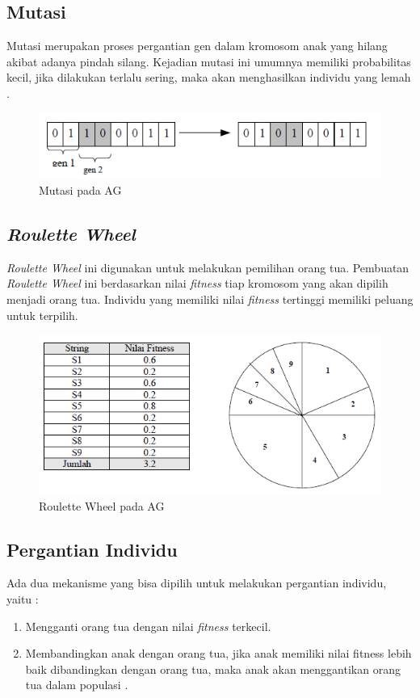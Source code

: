 \documentclass[12pt,a4paper]{report}
\begin{document}
		\subsection{Mutasi}
		Mutasi merupakan proses pergantian gen dalam kromosom anak yang hilang akibat adanya pindah silang. Kejadian mutasi ini umumnya memiliki probabilitas kecil, jika dilakukan terlalu sering, maka akan menghasilkan individu yang lemah \cite{Suyanto2007}.
		\begin{figure}[h]
			\centering
			\includegraphics[width=0.7\linewidth]{mutasi}
			\caption{Mutasi pada AG}
			\label{fig:mutasi}
		\end{figure}
		
		\subsection{\emph{Roulette Wheel}}
		\emph{Roulette Wheel} ini digunakan untuk melakukan pemilihan orang tua. Pembuatan \emph{Roulette Wheel} ini berdasarkan nilai \emph{fitness} tiap kromosom yang akan dipilih menjadi orang tua. Individu yang memiliki nilai \emph{fitness} tertinggi memiliki peluang untuk terpilih.
		\begin{figure}[h]
		\centering
		\includegraphics[width=0.7\linewidth]{roulette}
		\caption{Roulette Wheel pada AG}
		\label{fig:roulette}
		\end{figure}


		\subsection{Pergantian Individu}
		Ada dua mekanisme yang bisa dipilih untuk melakukan pergantian individu, yaitu : 
		\begin{enumerate}
			\item Mengganti orang tua dengan nilai \emph{fitness} terkecil.
			
			\item Membandingkan anak dengan orang tua, jika anak memiliki nilai fitness lebih baik dibandingkan dengan orang tua, maka anak akan menggantikan orang tua dalam populasi \cite{Suyanto2007}.
		\end{enumerate}
		
\end{document}
